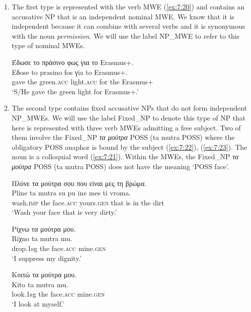 \documentclass[output=paper]{langsci/langscibook}
\begin{document}
\begin{enumerate}
\item The first type is represented with the verb MWE  (\ref{ex:7:20})  and  contains an accusative NP that is an independent nominal MWE. We know that it is independent because it can combine with several verbs and it is synonymous with the noun \textit{permission}.  We will use the label NP\_MWE to refer to this type of nominal MWEs.

\ea%
    \label{ex:7:20}
\glll Έδωσε το πράσινο φως για το  Erasmus+.\\
Eδose to prasino fos γia to Erasmus+.\\
             gave  the green.\textsc{acc} light.\textsc{acc} for the Erasmus+       \\
\glt        `S/He gave the green light for Erasmus+.'
\z

\item  The second type contains fixed accusative NPs that do not form independent NP\_MWEs. We will use the label Fixed\_NP to denote this type of NP that here is represented with three verb MWEs admitting a free subject. Two of them involve the Fixed\_NP  \textit{τα μούτρα} POSS (ta mutra POSS) where the obligatory \textsc{POSS} anaphor is bound by the subject (\ref{ex:7:22}), (\ref{ex:7:23}).  The noun  is a colloquial word (\ref{ex:7:21}). Within the MWEs, the Fixed\_NP \textit{τα μούτρα} POSS (ta mutra POSS) does not have the meaning `POSS face'.  

\ea
\label{ex:7:21}
\glll Πλύνε τα μούτρα σου που είναι μες τη βρώμα.\\
Pline ta mutra su pu ine mes ti vroma.\\
            wash.\textsc{imp} the face.\textsc{acc} yours.\textsc{gen} that is in the dirt\\
\glt        `Wash your face that is very dirty.'
\z

\ea
\label{ex:7:22}
\glll Ρίχνω τα μούτρα μου. \\
Riχno ta mutra mu.\\
             drop.1sg  the face.\textsc{acc} mine.\textsc{gen}\\
\glt      `I suppress my dignity.'
\z

\ea
\label{ex:7:23}
\glll  Κοιτώ τα μούτρα μου.\\
Kito ta mutra mu.\\
            look.1sg the face.\textsc{acc} mine.\textsc{gen}\\
\glt       `I look at myself.'
\z
\end{enumerate}
\end{document}
